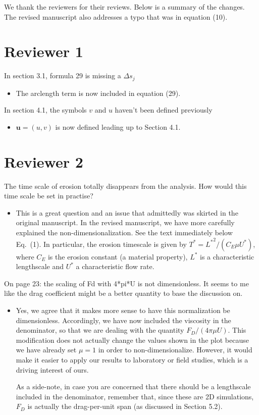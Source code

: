 \documentclass[11pt]{article}
\newcommand{\comment}[1]{{\color{blue} #1}}
\begin{document}
\noindent
We thank the reviewers for their reviews.  Below is a summary of the
changes.  The revised manuscript also addresses a typo that was in
equation (10).

\section*{Reviewer 1}

\noindent
\comment{In section 3.1, formula 29 is missing a $\Delta s_{j}$}
\begin{itemize}
  \item The arclength term is now included in equation (29).
\end{itemize}

\noindent
\comment{In section 4.1, the symbols $v$ and $u$ haven't been defined
previously}
\begin{itemize}
  \item $\mathbf{u} = (u,v)$ is now defined leading up to Section 4.1.
\end{itemize}



\section*{Reviewer 2}
\noindent
\comment{The time scale of erosion totally disappears from the analysis.
How would this time scale be set in practise?}
\begin{itemize}
\item This is a great question and an issue that admittedly was skirted in the original manuscript. In the revised manuscript, we have more carefully explained the non-dimensionalization. See the text immediately below Eq.~(1). In particular, the erosion timescale is given by $T^* = {L^*}^2/(C_E \mu U^*)$, where $C_E$ is the erosion constant (a material property), $L^*$ is a characteristic lengthscale and $U^*$ a characteristic flow rate.
\end{itemize}

\noindent
\comment{On page 23: the scaling of Fd with 4*pi*U is not dimensionless.
It seems to me like the drag coefficient might be a better quantity to
base the discussion on.}
\begin{itemize}
\item Yes, we agree that it makes more sense to have this normalization be dimensionless.  Accordingly, we have now included the viscosity in the denominator, so that we are dealing with the quantity $F_D /(4 \pi \mu U)$. This modification does not actually change the values shown in the plot because we have already set $\mu =1$ in order to non-dimensionalize. However, it would make it easier to apply our results to laboratory or field studies, which is a driving interest of ours.

As a side-note, in case you are concerned that there should be a lengthscale included in the denominator, remember that, since these are 2D simulations, $F_D$ is actually the drag-per-unit span (as discussed in Section 5.2).
\end{itemize}
\end{document}
